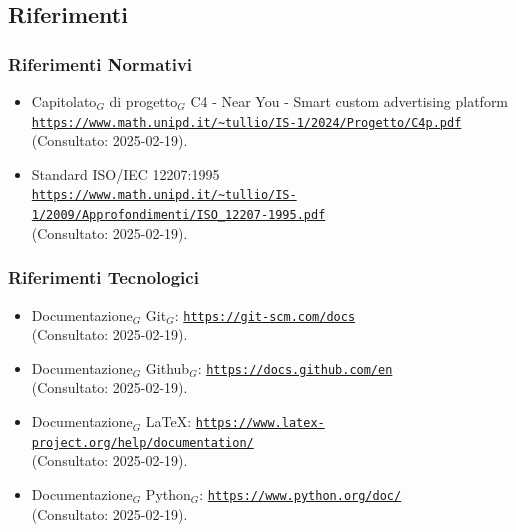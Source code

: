 \documentclass[10pt]{article}
\begin{document}
\begin{justify}
    \subsection{Riferimenti}
        \subsubsection{Riferimenti Normativi}
        \begin{itemize}
            \item Capitolato$_G$ di progetto$_G$ C4 - Near You - Smart custom advertising platform\\ \textcolor{blue}{\texttt{\url{https://www.math.unipd.it/~tullio/IS-1/2024/Progetto/C4p.pdf}}}\\ 
              (Consultato: 2025-02-19).
            \item Standard ISO/IEC 12207:1995\\ \textcolor{blue}{\texttt{\url{https://www.math.unipd.it/~tullio/IS-1/2009/Approfondimenti/ISO_12207-1995.pdf}}}\\
              (Consultato: 2025-02-19).
        \end{itemize}
        \subsubsection{Riferimenti Tecnologici}
        \begin{itemize}
            \item Documentazione$_G$ Git$_G$: \textcolor{blue}{\texttt{\url{https://git-scm.com/docs}}}\\
              (Consultato: 2025-02-19).
            \item Documentazione$_G$ Github$_G$: \textcolor{blue}{\texttt{\url{https://docs.github.com/en}}}\\
              (Consultato: 2025-02-19).
            \item Documentazione$_G$ \LaTeX: \textcolor{blue}{\texttt{\url{https://www.latex-project.org/help/documentation/}}}\\
              (Consultato: 2025-02-19).
            \item Documentazione$_G$ Python$_G$: \textcolor{blue}{\texttt{\url{https://www.python.org/doc/}}}\\
              (Consultato: 2025-02-19).
        \end{itemize}

\end{justify}
\end{document}
